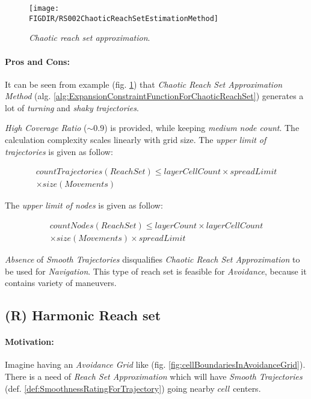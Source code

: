 \begin{figure}[H]
    \centering
    \texttt{[image: \\FIGDIR/RS002ChaoticReachSetEstimationMethod]} 
    \caption{\emph{Chaotic \emph{reach set} approximation}.}
    \label{fig:chaoticReachSetApproximation}
\end{figure}

\paragraph{Pros and Cons:} It can be seen from example (fig. \ref{fig:chaoticReachSetApproximation}) that \emph{Chaotic Reach Set Approximation Method} (alg. \ref{alg:ExpansionConstraintFunctionForChaoticReachSet}) generates a lot of \emph{turning} and \emph{shaky} \emph{trajectories}. 

\emph{High Coverage Ratio} ($\sim 0.9$) is provided, while keeping \emph{medium node count}. The calculation complexity scales linearly with grid size. The \emph{upper limit of trajectories} is given as follow:

\begin{multline}
    countTrajectories(ReachSet) \le layerCellCount \times spreadLimit\\ \times size(Movements)
\end{multline}

\noindent The \emph{upper limit of nodes} is given as follow:
    
\begin{multline}
    countNodes(ReachSet) \le layerCount \times  layerCellCount  \\
    \times size(Movements) \times spreadLimit  
\end{multline}

\noindent\emph{Absence} of \emph{Smooth Trajectories} disqualifies \emph{Chaotic Reach Set Approximation} to be used for \emph{Navigation}. This type of reach set is feasible for \emph{Avoidance}, because it contains variety of maneuvers.


\subsection{(R) Harmonic Reach set}\label{s:harmonicReachSet}

\paragraph{Motivation:} Imagine having an \emph{Avoidance Grid} like (fig. \ref{fig:cellBoundariesInAvoidanceGrid}). There is a need of \emph{Reach Set Approximation} which will have \emph{Smooth Trajectories} (def. \ref{def:SmoothnessRatingForTrajectory}) going nearby $cell$ centers.


